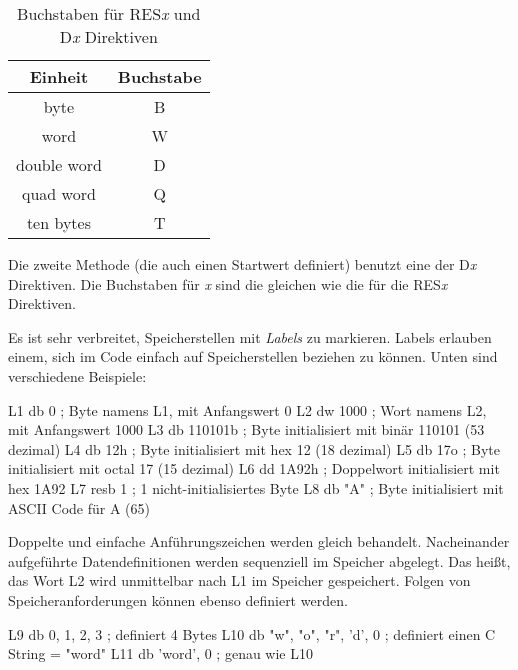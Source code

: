 \begin{table}[ht]
\centering
\begin{tabular}{||c|c||} \hline
{\bf Einheit} & {\bf Buchstabe} \\
\hline
 byte & B \\
 word & W \\
 double word & D \\
 quad word & Q \\
 ten bytes & T \\
\hline
\end{tabular}
\caption{Buchstaben f\"{u}r {\code RES\emph{x}} und {\code D\emph{x}}
Direktiven \label{tab:size-letters}}
\end{table}

Die zweite Methode (die auch einen Startwert definiert) benutzt eine
der {\code D{\em x}} Direktiven.  Die
Buchstaben f\"{u}r {\em x} sind die gleichen wie die f\"{u}r die {\code
RES{\em x}} Direktiven.

Es ist sehr verbreitet, Speicherstellen mit \emph{Labels}
 zu markieren. Labels erlauben einem, sich im Code
einfach auf Speicherstellen beziehen zu k\"{o}nnen. Unten sind
verschiedene Beispiele:
\begin{AsmCodeListing}[frame=none, numbers=left, commandchars=\\\{\}]
 L1   db     0              ; Byte namens L1, mit Anfangswert 0
 L2   dw     1000           ; Wort namens L2, mit Anfangswert 1000
 L3   db     110101b        ; Byte initialisiert mit bin\"{a}r 110101 (53 dezimal)
 L4   db     12h            ; Byte initialisiert mit hex 12 (18 dezimal)
 L5   db     17o            ; Byte initialisiert mit octal 17 (15 dezimal)
 L6   dd     1A92h          ; Doppelwort initialisiert mit hex 1A92
 L7   resb   1              ; 1 nicht-initialisiertes Byte
 L8   db     "A"            ; Byte initialisiert mit ASCII Code f\"{u}r A (65)
\end{AsmCodeListing}

Doppelte und einfache Anf\"{u}hrungszeichen werden gleich behandelt.
Nacheinander aufgef\"{u}hrte Datendefinitionen werden sequenziell im
Speicher abgelegt. Das hei{\ss}t, das Wort {\code L2} wird unmittelbar
nach {\code L1} im Speicher gespeichert. Folgen von
Speicheranforderungen k\"{o}nnen ebenso definiert werden.

\begin{AsmCodeListing}[frame=none, numbers=left, firstnumber=last]
 L9   db     0, 1, 2, 3            ; definiert 4 Bytes
 L10  db     "w", "o", "r", 'd', 0 ; definiert einen C String = "word"
 L11  db     'word', 0             ; genau wie L10
\end{AsmCodeListing}

